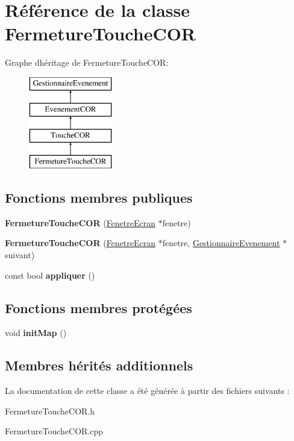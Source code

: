 \hypertarget{class_fermeture_touche_c_o_r}{}\section{Référence de la classe Fermeture\+Touche\+C\+OR}
\label{class_fermeture_touche_c_o_r}
Graphe d\textquotesingle{}héritage de Fermeture\+Touche\+C\+OR\+:\begin{figure}[H]
\begin{center}
\leavevmode
\includegraphics[height=4.000000cm]{class_fermeture_touche_c_o_r}
\end{center}
\end{figure}
\subsection*{Fonctions membres publiques}
\begin{DoxyCompactItemize}
\item 
\mbox{\label{class_fermeture_touche_c_o_r_af91c1176d128e36b96e3e07d94400019}} 
{\bfseries Fermeture\+Touche\+C\+OR} (\mbox{\hyperlink{class_fenetre_ecran}{Fenetre\+Ecran}} $\ast$fenetre)
\item 
\mbox{\label{class_fermeture_touche_c_o_r_a515a749f8bb3b725a32fd94e59445474}} 
{\bfseries Fermeture\+Touche\+C\+OR} (\mbox{\hyperlink{class_fenetre_ecran}{Fenetre\+Ecran}} $\ast$fenetre, \mbox{\hyperlink{class_gestionnaire_evenement}{Gestionnaire\+Evenement}} $\ast$suivant)
\item 
\mbox{\label{class_fermeture_touche_c_o_r_a77ff8a9c8e9c585bf084d60b43b4d37f}} 
const bool {\bfseries appliquer} ()
\end{DoxyCompactItemize}
\subsection*{Fonctions membres protégées}
\begin{DoxyCompactItemize}
\item 
\mbox{\label{class_fermeture_touche_c_o_r_a3aff286f6b7186564863c8b3889ae826}} 
void {\bfseries init\+Map} ()
\end{DoxyCompactItemize}
\subsection*{Membres hérités additionnels}


La documentation de cette classe a été générée à partir des fichiers suivants \+:\begin{DoxyCompactItemize}
\item 
Fermeture\+Touche\+C\+O\+R.\+h\item 
Fermeture\+Touche\+C\+O\+R.\+cpp\end{DoxyCompactItemize}

